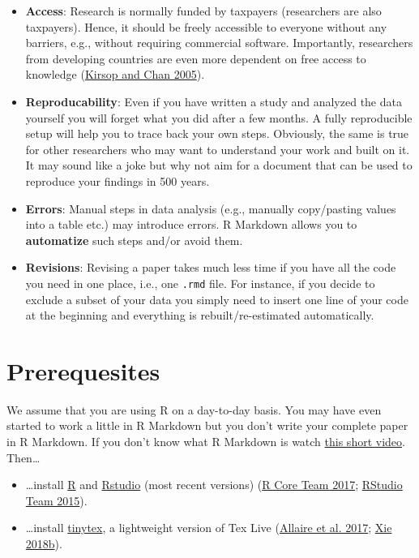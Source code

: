 \documentclass[
  12pt,
]{article}
\providecommand{\tightlist}{%
  \setlength{\itemsep}{0pt}\setlength{\parskip}{0pt}}
\begin{document}
\begin{itemize}
\tightlist
\item
  \textbf{Access}: Research is normally funded by taxpayers (researchers
  are also taxpayers). Hence, it should be freely accessible to everyone
  without any barriers, e.g., without requiring commercial software.
  Importantly, researchers from developing countries are even more
  dependent on free access to knowledge
  (\protect\hyperlink{ref-Kirsop2005-ro}{Kirsop and Chan 2005}).
\item
  \textbf{Reproducability}: Even if you have written a study and
  analyzed the data yourself you will forget what you did after a few
  months. A fully reproducible setup will help you to trace back your
  own steps. Obviously, the same is true for other researchers who may
  want to understand your work and built on it. It may sound like a joke
  but why not aim for a document that can be used to reproduce your
  findings in 500 years.
\item
  \textbf{Errors}: Manual steps in data analysis (e.g., manually
  copy/pasting values into a table etc.) may introduce errors. R
  Markdown allows you to \textbf{automatize} such steps and/or avoid
  them.
\item
  \textbf{Revisions}: Revising a paper takes much less time if you have
  all the code you need in one place, i.e., one \texttt{.rmd} file. For
  instance, if you decide to exclude a subset of your data you simply
  need to insert one line of your code at the beginning and everything
  is rebuilt/re-estimated automatically.
\end{itemize}

\hypertarget{prerequesites}{%
\section{Prerequesites}\label{prerequesites}}

We assume that you are using R on a day-to-day basis. You may have even
started to work a little in R Markdown but you don't write your complete
paper in R Markdown. If you don't know what R Markdown is watch
\href{https://vimeo.com/178485416}{this short video}. Then\ldots{}

\begin{itemize}
\tightlist
\item
  \ldots install \href{https://www.r-project.org/}{R} and
  \href{https://www.rstudio.com/}{Rstudio} (most recent versions)
  (\protect\hyperlink{ref-R2017}{R Core Team 2017};
  \protect\hyperlink{ref-Rstudio2015}{RStudio Team 2015}).
\item
  \ldots install \href{https://yihui.name/tinytex/}{tinytex}, a
  lightweight version of Tex Live
  (\protect\hyperlink{ref-markdown2017}{Allaire et al. 2017};
  \protect\hyperlink{ref-tinytex}{Xie 2018b}).
\end{itemize}
\end{document}
